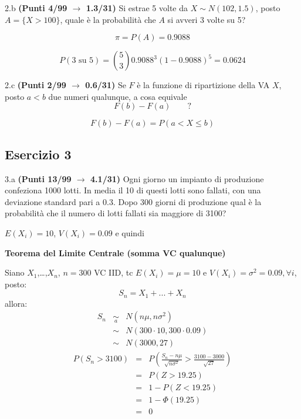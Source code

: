 \documentclass[
  11pt,
]{book}
\theoremstyle{mytheoremstyle}
\theoremstyle{mydefstyle}
\newenvironment{sol}
  {
  \begin{tcolorbox}[enhanced,breakable,arc=0.1mm,boxrule=1pt,colback=white,colframe=iblue,
  title=\bf \fontfamily{lmss}\selectfont \hspace{.5 cm} Soluzione,drop fuzzy shadow]

}{
\end{tcolorbox}
  }
\begin{document}
2.b \textbf{(Punti 4/99 \(\rightarrow\) 1.3/31)} Si estrae 5 volte da \(X\sim N(102,1.5)\), posto \(A=\{X>100\}\), quale è la probabilità che \(A\) si avveri 3 volte su 5?

\begin{sol}
\[
\pi=P(A)=0.9088
\]

\[
P(3\text{ su }5)=\binom{5}{3}0.9088^3(1-0.9088)^5=0.0624
\]

\end{sol}

2.c \textbf{(Punti 2/99 \(\rightarrow\) 0.6/31)} Se \(F\) è la funzione di ripartizione della VA \(X\), posto \(a < b\) due numeri qualunque, a cosa equivale
\[
F(b)-F(a) \qquad?
\]

\begin{sol}
\[
F(b)-F(a) = P(a<X\le b)
\]

\end{sol}

\subsection{Esercizio 3}\label{esercizio-3-9}

3.a \textbf{(Punti 13/99 \(\rightarrow\) 4.1/31)} Ogni giorno un impianto di produzione confeziona 1000 lotti. In media il 10 di questi lotti sono fallati, con una deviazione standard pari a 0.3. Dopo 300 giorni di produzione qual è la probabilità che il numero di lotti fallati sia maggiore di 3100?

\begin{sol}
\(E(X_i)=10\), \(V(X_i)=0.09\) e quindi

\textbf{Teorema del Limite Centrale (somma VC qualunque)}

Siano \(X_1\),\ldots,\(X_n\), \(n=300\) VC IID, tc \(E(X_i)=\mu=10\) e \(V(X_i)=\sigma^2=0.09,\forall i\), posto:
\[
      S_n = X_1 + ... + X_n
      \]
allora:\begin{eqnarray*}
  S_n & \mathop{\sim}\limits_{a}& N(n\mu,n\sigma^2) \\
     &\sim & N(300\cdot10,300\cdot0.09) \\
     &\sim & N(3000,27) 
  \end{eqnarray*}\begin{eqnarray*}
      P( S_n   >   3100 ) 
        &=& P\left(  \frac { S_n  -  n\mu }{ \sqrt{n\sigma^2} }  >  \frac { 3100  -  3000 }{\sqrt{ 27 }} \right)  \\
                 &=& P\left(  Z   >   19.25 \right) \\    &=& 1-P(Z< 19.25 )\\ 
                 &=&  1-\Phi( 19.25 ) \\ &=&  0 
      \end{eqnarray*}

\end{sol}
\end{document}
